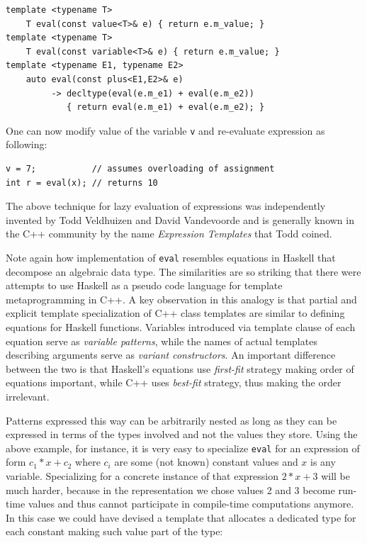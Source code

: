 \documentclass[preprint]{sigplanconf}
\makeatletter
\DeclareRobustCommand{\code}[1]{{\lstinline[breaklines=false,escapechar=@]{#1}}}
\makeatother
\begin{document}
\begin{lstlisting}[keepspaces,columns=flexible]
template <typename T> 
    T eval(const value<T>& e) { return e.m_value; }
template <typename T> 
    T eval(const variable<T>& e) { return e.m_value; }
template <typename E1, typename E2> 
    auto eval(const plus<E1,E2>& e) 
         -> decltype(eval(e.m_e1) + eval(e.m_e2))
            { return eval(e.m_e1) + eval(e.m_e2); }
\end{lstlisting}

\noindent One can now modify value of the variable \code{v} and re-evaluate 
expression as following:

\begin{lstlisting}
v = 7;           // assumes overloading of assignment
int r = eval(x); // returns 10
\end{lstlisting}

\noindent The above technique for lazy evaluation of expressions was 
independently invented by Todd Veldhuizen and David Vandevoorde and is generally 
known in the C++ community by the name \emph{Expression Templates} that Todd 
coined\cite{Veldhuizen95expressiontemplates, vandevoorde2003c++}.  

Note again how implementation of \code{eval} resembles equations in Haskell that 
decompose an algebraic data type. The similarities are so striking that there 
were attempts to use Haskell as a pseudo code language for template 
metaprogramming in C++\cite{Milewski11}. A key observation in this analogy is 
that partial and explicit template specialization of C++ class templates are 
similar to defining equations for Haskell functions. Variables introduced via 
template clause of each equation serve as \emph{variable patterns}, while the 
names of actual templates describing arguments serve as \emph{variant 
constructors}. An important difference between the two is that Haskell's 
equations use \emph{first-fit} strategy making order of equations important, 
while C++ uses \emph{best-fit} strategy, thus making the order irrelevant.

Patterns expressed this way can be arbitrarily nested as long as they can be 
expressed in terms of the types involved and not the values they store. Using 
the above example, for instance, it is very easy to specialize \code{eval} for 
an expression of form $c_1*x+c_2$ where $c_i$ are some (not known) constant 
values and $x$ is any variable. Specializing for a concrete instance of that 
expression $2*x+3$ will be much harder, because in the representation we chose 
values 2 and 3 become run-time values and thus cannot participate in 
compile-time computations anymore. In this case we could have devised a template 
that allocates a dedicated type for each constant making such value part of the 
type:
\end{document}
